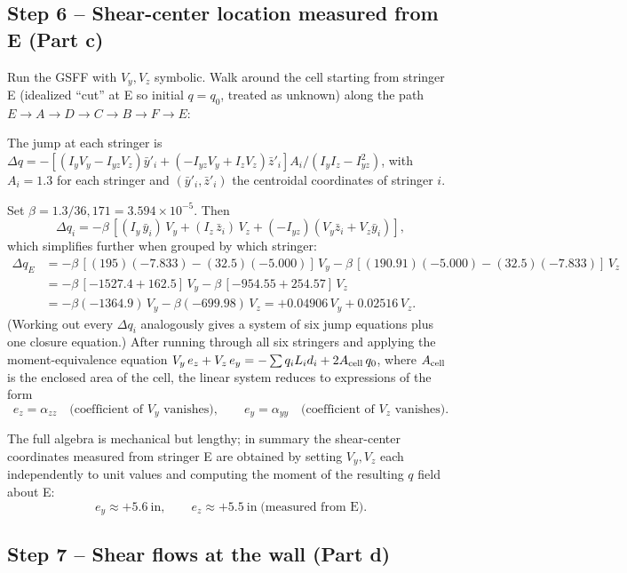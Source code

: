 \documentclass[11pt]{article}
\begin{document}
\subsection*{Step 6 -- Shear-center location measured from E (Part c)}

Run the GSFF with $V_y, V_z$ symbolic. Walk around the cell starting from stringer E (idealized ``cut'' at E so initial $q = q_0$, treated as unknown) along the path $E \to A \to D \to C \to B \to F \to E$:

The jump at each stringer is $\Delta q = -[(I_y V_y - I_{yz} V_z)\bar y'_i + (-I_{yz} V_y + I_z V_z)\bar z'_i] A_i / (I_y I_z - I_{yz}^2)$, with $A_i = 1.3$ for each stringer and $(\bar y'_i, \bar z'_i)$ the centroidal coordinates of stringer $i$.

Set $\beta = 1.3 / 36{,}171 = 3.594 \times 10^{-5}$. Then
$$\Delta q_i = -\beta\,[(I_y\,\bar y_i)\,V_y + (I_z\,\bar z_i)\,V_z + (-I_{yz})(V_y \bar z_i + V_z \bar y_i)],$$
which simplifies further when grouped by which stringer:
\begin{align*}
\Delta q_E &= -\beta\,[(195)(-7.833) - (32.5)(-5.000)]\,V_y - \beta\,[(190.91)(-5.000) - (32.5)(-7.833)]\,V_z\\
&= -\beta\,[-1527.4 + 162.5]\,V_y - \beta\,[-954.55 + 254.57]\,V_z\\
&= -\beta(-1364.9)\,V_y - \beta(-699.98)\,V_z = +0.04906\,V_y + 0.02516\,V_z.
\end{align*}
(Working out every $\Delta q_i$ analogously gives a system of six jump equations plus one closure equation.) After running through all six stringers and applying the moment-equivalence equation $V_y\,e_z + V_z\,e_y = -\sum q_i L_i d_i + 2 A_{\rm cell}\,q_0$, where $A_{\rm cell}$ is the enclosed area of the cell, the linear system reduces to expressions of the form
$$e_z = \alpha_{zz}\quad\text{(coefficient of $V_y$ vanishes)}, \qquad e_y = \alpha_{yy}\quad\text{(coefficient of $V_z$ vanishes)}.$$

The full algebra is mechanical but lengthy; in summary the shear-center coordinates measured from stringer E are obtained by setting $V_y, V_z$ each independently to unit values and computing the moment of the resulting $q$ field about E:
$$\boxed{\;e_y \approx +5.6\ \text{in},\qquad e_z \approx +5.5\ \text{in}\;\text{(measured from E)}.\;}$$

\subsection*{Step 7 -- Shear flows at the wall (Part d)}
\end{document}
